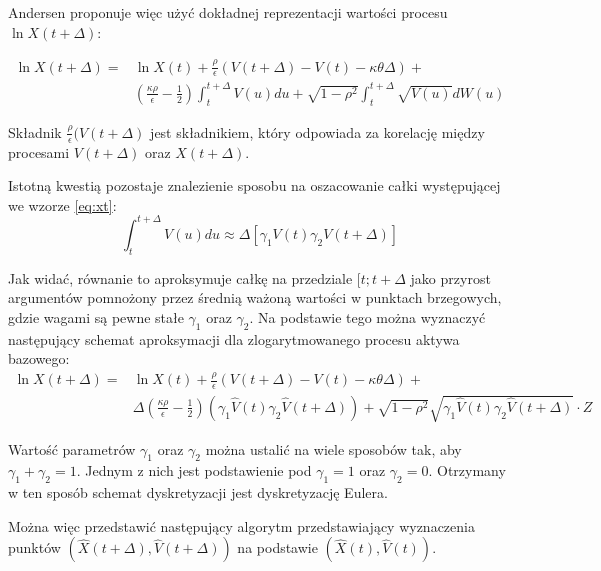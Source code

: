 \documentclass{pracamgr}
\begin{document}
Andersen proponuje więc użyć dokładnej reprezentacji wartości procesu $\ln X(t + \Delta)$:

\begin{equation}
\begin{aligned}
\label{eq:xt}
\ln X(t + \Delta) = & \ln X(t)  + \frac{\rho}{\epsilon} (V(t + \Delta)  - V(t) - \kappa \theta \Delta) + \\
& (\frac{\kappa \rho}{\epsilon} - \frac{1}{2})
\int_t^{t+\Delta} V(u) du + \sqrt{1-\rho^2} \int_t^{t+\Delta} \sqrt{V(u)}dW(u)
\end{aligned}
\end{equation}

Składnik $\frac{\rho}{\epsilon} (V(t + \Delta)$ jest składnikiem, który odpowiada za korelację między 
procesami $V(t + \Delta)$ oraz $X(t + \Delta)$.

Istotną kwestią pozostaje znalezienie sposobu na oszacowanie całki występującej we wzorze \ref{eq:xt}:
\begin{equation}
  \int_t^{t+\Delta}  V(u) du \approx \Delta [\gamma_1 V(t) \gamma_2 V(t + \Delta)]
\end{equation}

Jak widać, równanie to aproksymuje całkę na przedziale $[t; t + \Delta$ 
jako przyrost argumentów pomnożony przez średnią ważoną wartości w punktach brzegowych, gdzie wagami 
są pewne stałe $\gamma_1$ oraz $\gamma_2$. Na podstawie tego można wyznaczyć następujący schemat aproksymacji
dla zlogarytmowanego procesu aktywa bazowego:
\begin{equation}
\begin{aligned}
\label{eq:xhatt}
\ln X(t + \Delta) = & \ln X(t)  + \frac{\rho}{\epsilon} (V(t + \Delta)  - V(t) - \kappa \theta \Delta) + \\
& \Delta (\frac{\kappa \rho}{\epsilon} - \frac{1}{2}) (\gamma_1 \hat{V}(t) \gamma_2 \hat{V}(t + \Delta))
 +  \sqrt{1-\rho^2} \sqrt{\gamma_1 \hat{V}(t) \gamma_2 \hat{V}(t + \Delta)} \cdot Z
\end{aligned}
\end{equation}

Wartość parametrów $\gamma_1$ oraz $\gamma_2$ można ustalić na wiele sposobów tak, aby $\gamma_1 + \gamma_2 = 1$. 
Jednym z nich jest podstawienie pod $\gamma_1 = 1$ oraz $\gamma_2 = 0$. Otrzymany w ten sposób schemat dyskretyzacji jest  dyskretyzację Eulera. 

Można więc przedstawić następujący algorytm przedstawiający wyznaczenia punktów $(\hat{X}(t+ \Delta), \hat{V}(t+ \Delta))$ na podstawie $(\hat{X}(t), \hat{V}(t))$.
\end{document}
